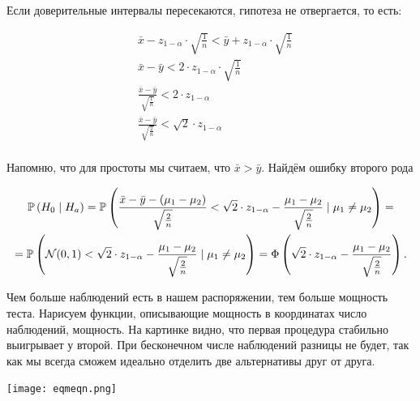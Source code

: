 \documentclass[12pt, a4paper, oneside]{article}
\begin{document}
Если доверительные интервалы пересекаются, гипотеза не отвергается, то есть: 

$$
\begin{aligned} 
& \bar{x} - z_{1 - \alpha} \cdot \sqrt{ \frac{1}{n} } < \bar{y} + z_{1 - \alpha} \cdot \sqrt{ \frac{1}{n} } \\
& \bar{x} - \bar{y} < 2 \cdot z_{1 - \alpha} \cdot \sqrt{ \frac{1}{n} } \\
& \frac{\bar{x} - \bar{y}}{  \sqrt{ \frac{1}{n} } }  < 2 \cdot z_{1 - \alpha} \\
& \frac{\bar{x} - \bar{y}}{  \sqrt{ \frac{2}{n} } }  < \sqrt{2} \cdot z_{1 - \alpha} \\
\end{aligned} 
$$

Напомню, что для простоты мы считаем, что $\bar x > \bar y$. Найдём ошибку второго рода

\begin{multline*}
\mathbb{P} \left( H_0 \mid H_a \right)  = \mathbb{P} \left( \frac{\bar{x} - \bar{y} - (\mu_1 - \mu_2)}{\sqrt{\frac{2}{n}}} < \sqrt{2} \cdot z_{1-\alpha} - \frac{\mu_1 - \mu_2}{\sqrt{\frac{2}{n}}} \mid \mu_1 \ne \mu_2 \right) = \\ = \mathbb{P} \left( \mathcal{N}(0,1) < \sqrt{2} \cdot z_{1-\alpha} - \frac{\mu_1 - \mu_2}{\sqrt{\frac{2}{n}}} \mid \mu_1 \ne \mu_2 \right) = \Phi \left( \sqrt{2} \cdot  z_{1-\alpha} - \frac{\mu_1 - \mu_2}{\sqrt{\frac{2}{n}}} \right).
\end{multline*}


Чем больше наблюдений есть в нашем распоряжении, тем больше мощность теста. Нарисуем функции, описывающие мощность в координатах число наблюдений, мощность. На картинке видно, что первая процедура стабильно выигрывает у второй. При бесконечном числе наблюдений разницы не будет, так как мы всегда сможем идеально отделить две альтернативы друг от друга. 

\begin{center} 
    \texttt{[image: eqmeqn.png]}
\end{center} 
\end{document}
